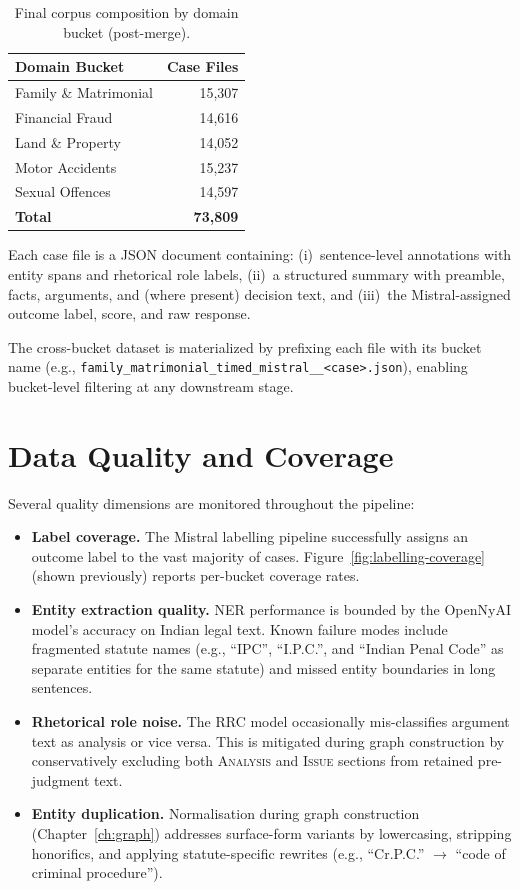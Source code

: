 \begin{table}[H]
\centering
\caption{Final corpus composition by domain bucket (post-merge).}
\label{tab:final-corpus}
\begin{tabular}{@{}lr@{}}
\toprule
\textbf{Domain Bucket} & \textbf{Case Files} \\
\midrule
Family \& Matrimonial  & 15,307 \\
Financial Fraud        & 14,616 \\
Land \& Property       & 14,052 \\
Motor Accidents        & 15,237 \\
Sexual Offences        & 14,597 \\
\midrule
\textbf{Total}         & \textbf{73,809} \\
\bottomrule
\end{tabular}
\end{table}

Each case file is a JSON document containing: (i)~sentence-level annotations with entity spans and rhetorical role labels, (ii)~a structured summary with preamble, facts, arguments, and (where present) decision text, and (iii)~the Mistral-assigned outcome label, score, and raw response.

The cross-bucket dataset is materialized by prefixing each file with its bucket name (e.g., \texttt{family\_matrimonial\_timed\_mistral\_\_<case>.json}), enabling bucket-level filtering at any downstream stage.

\section{Data Quality and Coverage}
\label{sec:quality}

Several quality dimensions are monitored throughout the pipeline:

\begin{itemize}
    \item \textbf{Label coverage.} The Mistral labelling pipeline successfully assigns an outcome label to the vast majority of cases. Figure~\ref{fig:labelling-coverage} (shown previously) reports per-bucket coverage rates.
    \item \textbf{Entity extraction quality.} NER performance is bounded by the OpenNyAI model's accuracy on Indian legal text. Known failure modes include fragmented statute names (e.g., ``IPC'', ``I.P.C.'', and ``Indian Penal Code'' as separate entities for the same statute) and missed entity boundaries in long sentences.
    \item \textbf{Rhetorical role noise.} The RRC model occasionally mis-classifies argument text as analysis or vice versa. This is mitigated during graph construction by conservatively excluding both \textsc{Analysis} and \textsc{Issue} sections from retained pre-judgment text.
    \item \textbf{Entity duplication.} Normalisation during graph construction (Chapter~\ref{ch:graph}) addresses surface-form variants by lowercasing, stripping honorifics, and applying statute-specific rewrites (e.g., ``Cr.P.C.'' $\to$ ``code of criminal procedure'').
\end{itemize}

